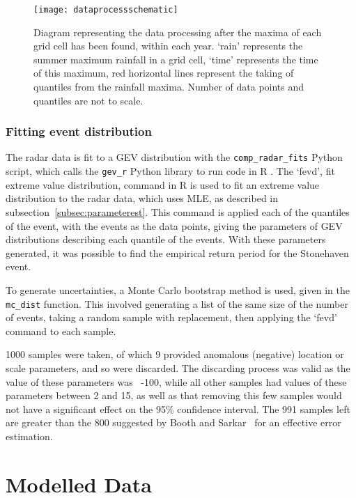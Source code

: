 \begin{figure}[H]
    \centering
    \texttt{[image: dataprocessschematic]}
    \caption[Diagram representing the data processing.]{
        Diagram representing the data processing after the maxima of each grid cell has been found,
    within each year.
    `rain' represents the summer maximum rainfall in a grid cell,
        `time' represents the time of this maximum,
        red horizontal lines represent the taking of quantiles from the rainfall maxima.
    Number of data points and quantiles are not to scale.}
    \label{fig:dataprocessschematic}
\end{figure}

\subsubsection{Fitting event distribution}

The radar data is fit to a GEV distribution with the \texttt{comp\_radar\_fits} Python script,
    which calls the \texttt{gev\_r} Python library to run code in R .
The `fevd', fit extreme value distribution,
    command in R is used to fit an extreme value distribution to the radar data,
    which uses MLE, as described in subsection~\ref{subsec:parameterest}.
This command is applied each of the quantiles of the event,
    with the events as the data points,
    giving the parameters of GEV distributions describing each quantile of the events.
With these parameters generated,
     it was possible to find the empirical return period for the Stonehaven event.

To generate uncertainties,
    a Monte Carlo bootstrap method is used,
    given in the \texttt{mc\_dist} function.
This involved generating a list of the same size of the number of events,
    taking a random sample with replacement,
    then applying the `fevd' command to each sample.

1000 samples were taken,
    of which 9 provided anomalous (negative) location or scale parameters,
    and so were discarded.
The discarding process was valid as the value of these parameters was ~-100,
    while all other samples had values of these parameters between 2 and 15,
    as well as that removing this few samples would not have a significant effect on the 95\% confidence interval.
The 991 samples left are greater than the 800 suggested by Booth and Sarkar~\cite{Booth_Sarkar_1998}
    for an effective error estimation.

\section{Modelled Data}\label{sec:model}

